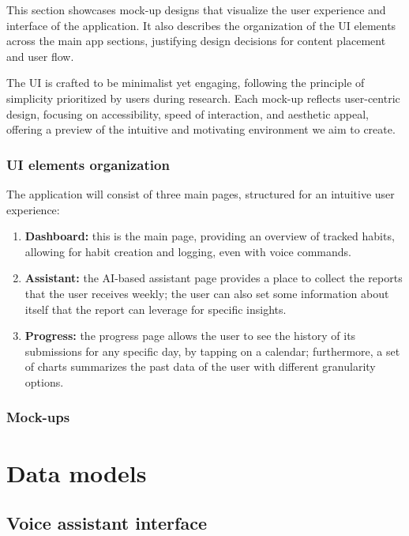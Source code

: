 \documentclass{article}
\begin{document}
This section showcases mock-up designs that visualize the user experience and interface of the application.
It also describes the organization of the UI elements across the main app sections, justifying design decisions for content placement and user flow.

The UI is crafted to be minimalist yet engaging, following the principle of simplicity prioritized by users during research.
Each mock-up reflects user-centric design, focusing on accessibility, speed of interaction, and aesthetic appeal, offering a preview of the intuitive and motivating environment we aim to create.

\subsubsection{UI elements organization}

The application will consist of three main pages, structured for an intuitive user experience:

\begin{enumerate}
    \item \textbf{Dashboard:} this is the main page, providing an overview of tracked habits, allowing for habit creation and logging, even with voice commands.
    \item \textbf{Assistant:} the AI-based assistant page provides a place to collect the reports that the user receives weekly; the user can also set some information about itself that the report can leverage for specific insights.
    \item \textbf{Progress:} the progress page allows the user to see the history of its submissions for any specific day, by tapping on a calendar; furthermore, a set of charts summarizes the past data of the user with different granularity options.
\end{enumerate}

\subsubsection{Mock-ups}



\newpage
\section{Data models}

\subsection{Voice assistant interface}
\end{document}
